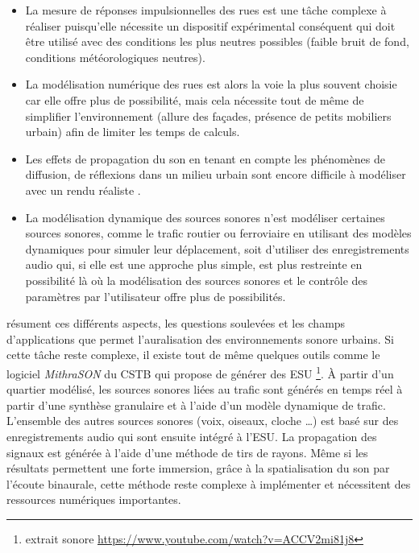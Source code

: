\begin{itemize}
\item La mesure de réponses impulsionnelles des rues \cite{picaut2005experimental} est une tâche complexe à réaliser puisqu'elle nécessite un dispositif expérimental conséquent qui doit être utilisé avec des conditions les plus neutres possibles (faible bruit de fond, conditions météorologiques neutres).
\item La modélisation numérique des rues est alors la voie la plus souvent choisie car elle offre plus de possibilité, mais cela nécessite tout de même de simplifier l'environnement (allure des façades, présence de petits mobiliers urbain) afin de limiter les temps de calculs.
\item Les effets de propagation du son en tenant en compte les phénomènes de diffusion, de réflexions dans un milieu urbain sont encore difficile à modéliser avec un rendu réaliste \cite{schissler2014high}.
\item La modélisation dynamique des sources sonores n'est modéliser certaines sources sonores, comme le trafic routier ou ferroviaire en utilisant des modèles dynamiques pour simuler leur déplacement, soit d'utiliser des enregistrements audio qui, si elle est une approche plus simple, est plus restreinte en possibilité là où la modélisation des sources sonores et le contrôle des paramètres par l'utilisateur offre plus de possibilités. 
\end{itemize}

\cite{stienen2015auralization} résument ces différents aspects, les questions soulevées et les champs d'applications que permet l'auralisation des environnements sonore urbains.
Si cette tâche reste complexe, il existe tout de même quelques outils comme le logiciel \textit{MithraSON} du CSTB qui propose de générer des ESU \footnote{extrait sonore \url{https://www.youtube.com/watch?v=ACCV2mi81j8}}. À partir d'un quartier modélisé, les sources sonores liées au trafic sont générés en temps réel à partir d'une synthèse granulaire et à l'aide d'un modèle dynamique de trafic. L'ensemble des autres sources sonores (voix, oiseaux, cloche \dots) est basé sur des enregistrements audio qui sont ensuite intégré à l'ESU. La propagation des signaux est générée à l'aide d'une méthode de tirs de rayons.
Même si les résultats permettent une forte immersion, grâce à la spatialisation du son par l'écoute binaurale, cette méthode reste complexe à implémenter et nécessitent des ressources numériques importantes.

